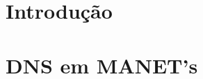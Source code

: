 \documentclass[]{article}
\title{}
\author{Fernando Cezar Bernardelli}
\date{}
\begin{document}
\ifpdf
{}
\else
{}
\fi

\maketitle


\begin{abstract}
\end{abstract}

\section{Introdução}


\section{DNS em MANET's}




\end{document}
